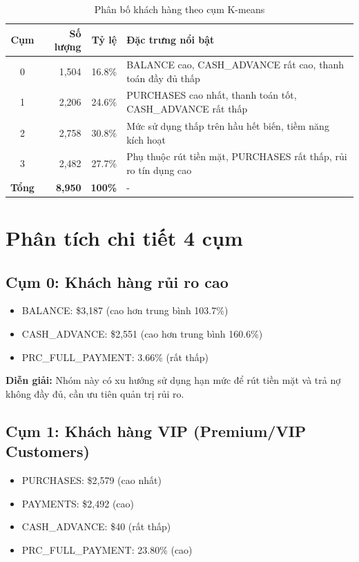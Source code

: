 \begin{table}[H]
\centering
\caption{Phân bố khách hàng theo cụm K-means}
\begin{tabular}{|c|r|r|p{6cm}|}
\hline
\textbf{Cụm} & \textbf{Số lượng} & \textbf{Tỷ lệ} & \textbf{Đặc trưng nổi bật} \\
\hline
0 & 1,504 & 16.8\% & BALANCE cao, CASH\_ADVANCE rất cao, thanh toán đầy đủ thấp \\
\hline
1 & 2,206 & 24.6\% & PURCHASES cao nhất, thanh toán tốt, CASH\_ADVANCE rất thấp \\
\hline
2 & 2,758 & 30.8\% & Mức sử dụng thấp trên hầu hết biến, tiềm năng kích hoạt \\
\hline
3 & 2,482 & 27.7\% & Phụ thuộc rút tiền mặt, PURCHASES rất thấp, rủi ro tín dụng cao \\
\hline
\textbf{Tổng} & \textbf{8,950} & \textbf{100\%} & - \\
\hline
\end{tabular}
\end{table}

\section{Phân tích chi tiết 4 cụm}

\subsection{Cụm 0: Khách hàng rủi ro cao}

\begin{itemize}
    \item BALANCE: \$3,187 (cao hơn trung bình 103.7\%)
    \item CASH\_ADVANCE: \$2,551 (cao hơn trung bình 160.6\%)
    \item PRC\_FULL\_PAYMENT: 3.66\% (rất thấp)
\end{itemize}

\textbf{Diễn giải:} Nhóm này có xu hướng sử dụng hạn mức để rút tiền mặt và trả nợ không đầy đủ, cần ưu tiên quản trị rủi ro.

\subsection{Cụm 1: Khách hàng VIP (Premium/VIP Customers)}

\begin{itemize}
    \item PURCHASES: \$2,579 (cao nhất)
    \item PAYMENTS: \$2,492 (cao)
    \item CASH\_ADVANCE: \$40 (rất thấp)
    \item PRC\_FULL\_PAYMENT: 23.80\% (cao)
\end{itemize}

